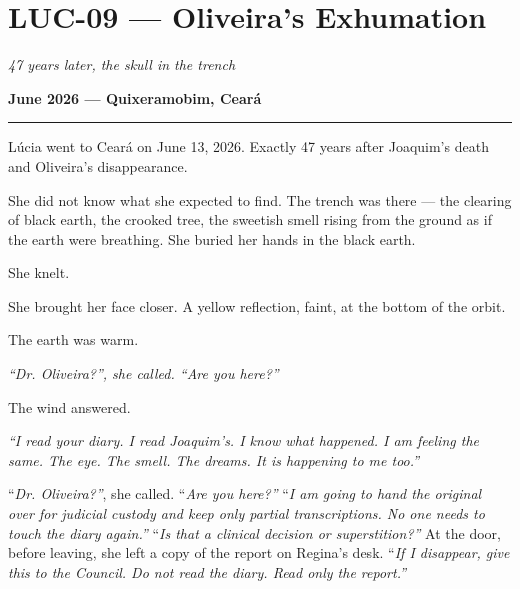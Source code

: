 \section*{\textbf{LUC-09} --- Oliveira's Exhumation}

\noindent \textit{47 years later, the skull in the trench}

\noindent \textbf{June 2026 --- Quixeramobim, Ceará}

\vspace{0.5em}\noindent\rule{\textwidth}{0.5pt}\vspace{0.5em}

\noindent Lúcia went to Ceará on June 13, 2026. Exactly 47 years after Joaquim's death and Oliveira's disappearance.

\noindent She did not know what she expected to find. The trench was there --- the clearing of black earth, the crooked tree, the sweetish smell rising from the ground as if the earth were breathing.
\noindent She buried her hands in the black earth.

\noindent She knelt.

\noindent She brought her face closer.
\noindent A yellow reflection, faint, at the bottom of the orbit.

\noindent The earth was warm.

\noindent \textit{\textquotedblleft{}Dr. Oliveira?\textquotedblright{}\textit{, she called. }\textquotedblleft{}Are you here?\textquotedblright{}}

\noindent The wind answered.

\noindent \textit{\textquotedblleft{}I read your diary. I read Joaquim's. I know what happened. I am feeling the same. The eye. The smell. The dreams. It is happening to me too.\textquotedblright{}}

\noindent \textquotedblleft{\textit{Dr. Oliveira?\textquotedblright{}}}, she called. \textquotedblleft{\textit{Are you here?\textquotedblright{}}}
\noindent \textquotedblleft{\textit{I am going to hand the original over for judicial custody and keep only partial transcriptions. No one needs to touch the diary again.\textquotedblright{}}}
\noindent \textquotedblleft{\textit{Is that a clinical decision or superstition?\textquotedblright{}}}
\noindent At the door, before leaving, she left a copy of the report on Regina's desk.
\noindent \textquotedblleft{\textit{If I disappear, give this to the Council. Do not read the diary. Read only the report.\textquotedblright{}}}

